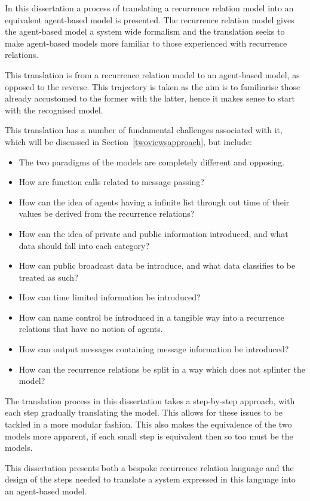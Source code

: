 \documentclass{article}
\begin{document}
In this dissertation a process of translating a recurrence relation model into an equivalent agent-based model is presented. The recurrence relation model gives the agent-based model a system wide formalism and the translation seeks to make agent-based models more familiar to those experienced with recurrence relations. 

This translation is from a recurrence relation model to an agent-based model, as opposed to the reverse. This trajectory is taken as the aim is to familiarise those already accustomed to the former with the latter, hence it makes sense to start with the recognised model.  

This translation has a number of fundamental challenges associated with it, which will be discussed in Section~\ref{twoviewsapproach}, but include:
\begin{itemize}
   \item The two paradigms of the models are completely different and opposing. 
   \item How are function calls related to message passing?
   \item How can the idea of agents having a infinite list through out time of their values be derived from the recurrence relations? 
   \item How can the idea of private and public information introduced, and what data should fall into each category? 
   \item How can public broadcast data be introduce, and what data classifies to be treated as such? 
   \item How can time limited information be introduced?
   \item How can name control be introduced in a tangible way into a recurrence relations that have no notion of agents. 
   \item How can output messages containing message information be introduced? 
   \item How can the recurrence relations be split in a way which does not splinter the model? 
\end{itemize}

The translation process in this dissertation takes a step-by-step approach, with each step gradually translating the model. This allows for these issues to be tackled in a more modular fashion. This also makes the equivalence of the two models more apparent, if each small step is equivalent then so too must be the models.  

This dissertation presents both a bespoke recurrence relation language and the design of the steps needed to translate a system expressed in this language into an agent-based model. 
\end{document}
